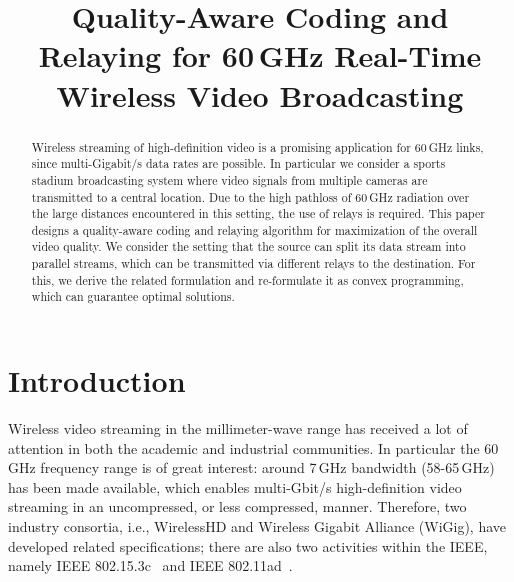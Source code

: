 \documentclass[conference]{IEEEtran}
\begin{document}
\title{Quality-Aware Coding and Relaying for 60\,GHz Real-Time Wireless Video Broadcasting}
\author{
}

\maketitle

\begin{abstract}
Wireless streaming of high-definition video is a promising application for 60\,GHz links, since multi-Gigabit/s data rates are possible.
In particular we consider a sports stadium broadcasting system where video signals from multiple cameras are transmitted to a central location.
Due to the high pathloss of 60\,GHz radiation over the large distances encountered in this setting, the use of relays is required.
This paper designs a quality-aware coding and relaying algorithm for maximization of the overall video quality.
We consider the setting that the source can split its data stream into parallel streams, which can be transmitted via different relays to the destination.
For this, we derive the related formulation and re-formulate it as convex programming, which can guarantee optimal solutions.
\end{abstract}

\IEEEpeerreviewmaketitle

\section{Introduction}\label{sec:intro}
Wireless video streaming in the millimeter-wave range has received a lot of attention in both the academic and industrial communities. In particular the 60\,GHz frequency range is of great interest: around 7\,GHz bandwidth (58-65\,GHz) has been made available, which enables multi-Gbit/s high-definition video streaming in an uncompressed, or less compressed, manner.
Therefore, two industry consortia, i.e.,
	WirelessHD and Wireless Gigabit Alliance (WiGig), have developed related specifications; there are also two activities within the IEEE, namely IEEE 802.15.3c~\cite{153c} and IEEE 802.11ad~\cite{11ad}.
\end{document}
